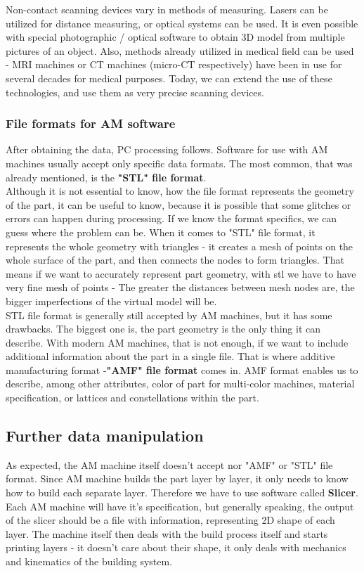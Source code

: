 \documentclass[a4paper, twoside, 11pt]{report}
\begin{document}
    
Non-contact scanning devices vary in methods of measuring. Lasers can be utilized for distance measuring, or optical systems can be used. It is even possible with special photographic / optical software to obtain 3D model from multiple pictures of an object. Also, methods already utilized in medical field can be used - MRI machines or CT machines (micro-CT respectively) have been in use for several decades for medical purposes. Today, we can extend the use of these technologies, and use them as very precise scanning devices.
\subsubsection{File formats for AM software}
After obtaining the data, PC processing follows. Software for use with AM machines usually accept only specific data formats. The most common, that was already mentioned, is the \textbf{"STL" file format}.\\
Although it is not essential to know, how the file format represents the geometry of the part, it can be useful to know, because it is possible that some glitches or errors can happen during processing. If we know the format specifics, we can guess where the problem can be. When it comes to "STL" file format, it represents the whole geometry with triangles - it creates a mesh of points on the whole surface of the part, and then connects the nodes to form triangles. That means if we want to accurately represent part geometry, with stl we have to have very fine mesh of points - The greater the distances between mesh nodes are, the bigger imperfections of the virtual model will be.\\
STL file format is generally still accepted by AM machines, but it has some drawbacks. The biggest one is, the part geometry is the only thing it can describe. With modern AM machines, that is not enough, if we want to include additional information about the part in a single file. That is where additive manufacturing format -\textbf{"AMF" file format} comes in. AMF format enables us to describe, among other attributes, color of part for multi-color machines, material specification, or lattices and constellations within the part.
\subsection{Further data manipulation}
As expected, the AM machine itself doesn't accept nor "AMF" or "STL" file format. Since AM machine builds the part layer by layer, it only needs to know how to build each separate layer. Therefore we have to use software called \textbf{Slicer}. Each AM machine will have it's specification, but generally speaking, the output of the slicer should be a file with information, representing 2D shape of each layer. The machine itself then deals with the build process itself and starts printing layers - it doesn't care about their shape, it only deals with mechanics and kinematics of the building system.
\end{document}
